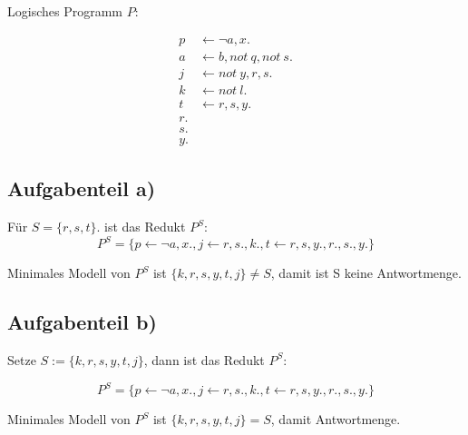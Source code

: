 Logisches Programm $P$:

\begin{align*}
p &\leftarrow \neg{a}, x.\\
a &\leftarrow b, not\ q, not\ s.\\
j &\leftarrow not\ y, r, s.\\
k &\leftarrow not\ l.\\
t &\leftarrow r, s, y.\\
r.\\
s.\\
y.
\end{align*}

\subsection*{Aufgabenteil a)}

Für $S = \{r, s, t\}.$ ist das Redukt $P^S$:
\begin{equation*}
P^S = \{p \leftarrow \neg{a}, x., j \leftarrow r, s., k., t\leftarrow r, s, y., r., s., y.\}
\end{equation*}

Minimales Modell von $P^S$ ist $\{k, r, s, y, t, j\} \neq S$, damit ist S keine Antwortmenge.

\subsection*{Aufgabenteil b)}

Setze $S := \{k, r, s, y, t, j\}$, dann ist das Redukt $P^S$:

\begin{equation*}
P^S = \{p \leftarrow \neg{a}, x., j \leftarrow r, s., k., t \leftarrow r, s, y., r., s., y. \}
\end{equation*}

Minimales Modell von $P^S$ ist $\{k, r, s, y, t, j\} = S$, damit Antwortmenge.